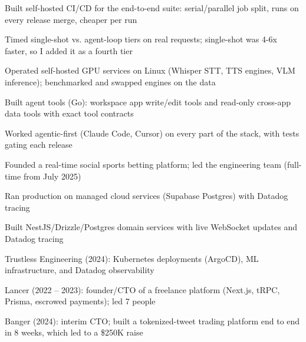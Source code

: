 \documentclass[print]{jack-resume}
\begin{document}
\begin{tightemize}
    \item Built self-hosted CI/CD for the end-to-end suite: serial/parallel job split, runs on every release merge, cheaper per run
    \item Timed single-shot vs. agent-loop tiers on real requests; single-shot was 4-6x faster, so I added it as a fourth tier
    \item Operated self-hosted GPU services on Linux (Whisper STT, TTS engines, VLM inference); benchmarked and swapped engines on the data
    \item Built agent tools (Go): workspace app write/edit tools and read-only cross-app data tools with exact tool contracts
    \item Worked agentic-first (Claude Code, Cursor) on every part of the stack, with tests gating each release
\end{tightemize}
\sectionsep

\begin{tightemize}
    \item Founded a real-time social sports betting platform; led the engineering team (full-time from July 2025)
    \item Ran production on managed cloud services (Supabase Postgres) with Datadog tracing
    \item Built NestJS/Drizzle/Postgres domain services with live WebSocket updates and Datadog tracing
\end{tightemize}
\sectionsep

\begin{tightemize}
    \item Trustless Engineering (2024): Kubernetes deployments (ArgoCD), ML infrastructure, and Datadog observability
    \item Lancer (2022 -- 2023): founder/CTO of a freelance platform (Next.js, tRPC, Prisma, escrowed payments); led 7 people
    \item Banger (2024): interim CTO; built a tokenized-tweet trading platform end to end in 8 weeks, which led to a \$250K raise
\end{tightemize}
\sectionsep
\end{document}
